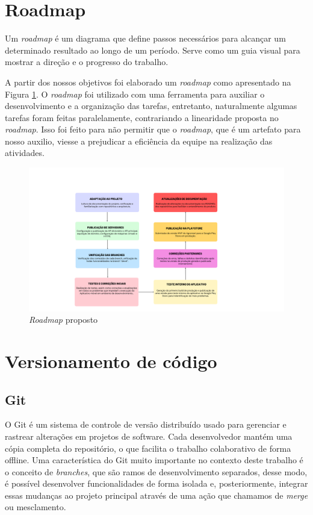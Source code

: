 \section{Roadmap}
Um \textit{roadmap} é um diagrama que define passos necessários para alcançar um determinado resultado ao longo de um período. Serve como um guia visual para mostrar a direção e o progresso do trabalho.

A partir dos nossos objetivos foi elaborado um \textit{roadmap} como apresentado na Figura \ref{roadmap}. O \textit{roadmap} foi utilizado com uma ferramenta para auxiliar o desenvolvimento e a organização das tarefas, entretanto, naturalmente algumas tarefas foram feitas paralelamente, contrariando a linearidade proposta no \textit{roadmap}. Isso foi feito para não permitir que o \textit{roadmap}, que é um artefato para nosso auxilio, viesse a prejudicar a eficiência da equipe na realização das atividades.

\begin{figure}[h]
	\centering
	\includegraphics[keepaspectratio=true,scale=0.3]{figuras/roadmap2.png}
	\caption{\textit{Roadmap} proposto}
	\label{roadmap}
\end{figure}


\section{Versionamento de código}

\subsection{Git}
O Git \cite{git2024} é um sistema de controle de versão distribuído usado para gerenciar e rastrear alterações em projetos de software. Cada desenvolvedor mantém uma cópia completa do repositório, o que facilita o trabalho colaborativo de forma offline. Uma característica do Git muito importante no contexto deste trabalho é o conceito de \textit{branches}, que são ramos de desenvolvimento separados, desse modo, é possível desenvolver funcionalidades de forma isolada e, posteriormente, integrar essas mudanças ao projeto principal através de uma ação que chamamos de \textit{merge} ou mesclamento.

